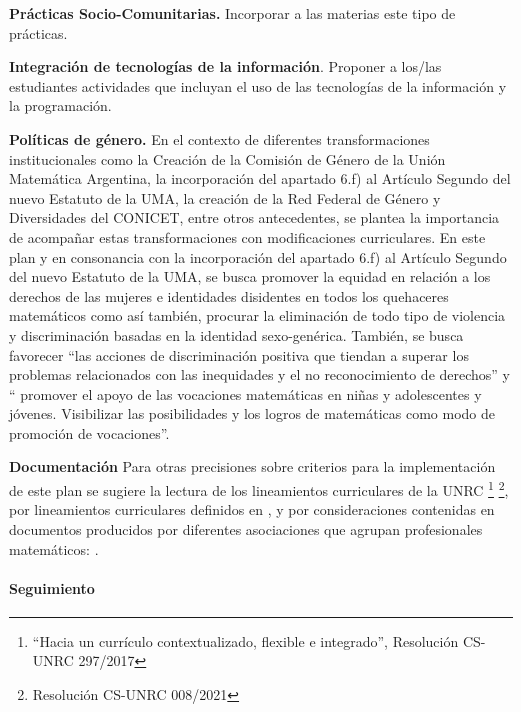 \documentclass[a4paper, 12pt]{article}
\begin{document}
\begin{description}
\item{\textbf{Prácticas Socio-Comunitarias.} } Incorporar a las materias este tipo de prácticas.


\item{ \textbf{Integración de tecnologías de la información}.} Proponer a los/las estudiantes actividades que incluyan el uso de las tecnologías de la información y la programación.  



\item{\textbf{Políticas de género.}}
En el contexto de diferentes transformaciones institucionales como la Creación de la Comisión de Género de la Unión Matemática Argentina, la incorporación del apartado 6.f) al Artículo Segundo del nuevo Estatuto de la UMA, la creación de la Red Federal de Género y Diversidades del CONICET, entre otros antecedentes, se plantea la importancia de acompañar estas transformaciones con  modificaciones curriculares. 
En este plan y en consonancia con la incorporación del apartado 6.f) al Artículo Segundo del nuevo Estatuto de la UMA, se  busca promover la equidad en relación a los derechos de las mujeres e identidades disidentes en todos los quehaceres matemáticos  como así también,  procurar la eliminación de todo tipo de violencia y discriminación basadas en la identidad sexo-genérica.
También, se busca favorecer “las acciones de discriminación positiva que tiendan a superar los problemas relacionados con las inequidades y el no reconocimiento de derechos”  y    “ promover el apoyo de las vocaciones matemáticas en niñas y adolescentes y jóvenes. Visibilizar las posibilidades y los logros de matemáticas como modo de promoción de vocaciones”.
 
 \item{\textbf{Documentación}} Para otras precisiones sobre criterios para la implementación de este plan se sugiere la lectura de los lineamientos curriculares de la UNRC \footnote{``Hacia   un   currículo contextualizado, flexible e integrado'', Resolución CS-UNRC 297/2017 }
\footnote{ Resolución CS-UNRC 008/2021}, por lineamientos curriculares definidos en  \cite{paniagua2013educacion}, y por consideraciones contenidas en documentos producidos por diferentes asociaciones que agrupan profesionales matemáticos: \cite{uma,society1996siam,society2012siam,damlamian2013educational}.

\end{description}


\paragraph{Seguimiento} 
\end{document}
